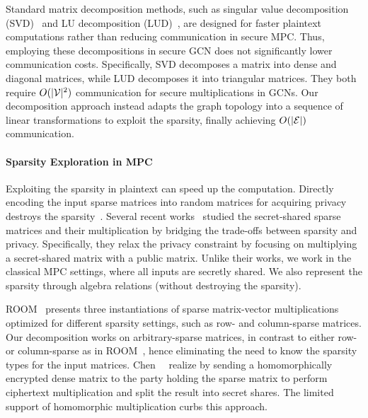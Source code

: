 Standard matrix decomposition methods, such as singular value decomposition (SVD)~\cite{banerjee2014linear} and LU decomposition (LUD)~\cite{bunch1974triangular}, are designed for faster plaintext computations rather than reducing communication in secure MPC.
Thus, employing these decompositions in secure GCN does not significantly lower communication costs.
Specifically, SVD decomposes a matrix into dense and diagonal matrices, while LUD decomposes it into triangular matrices. 
They both require $O(|\mathcal{V}|^2)$ communication for secure multiplications in GCNs.
Our decomposition approach instead adapts the graph topology into a sequence of linear transformations to exploit the sparsity, finally achieving $O(|\mathcal{E}|)$ communication.

\paragraph{Sparsity Exploration in MPC} 
Exploiting the sparsity in plaintext can speed up the computation.
Directly encoding the input sparse matrices into random matrices for acquiring privacy destroys the %
sparsity~\cite{isit/XhemrishiBW22}.
Several recent works~\cite{isit/XhemrishiBW22,tifs/BitarEWX24} studied the secret-shared sparse matrices and their multiplication by bridging the trade-offs between sparsity and privacy.
Specifically, they relax the privacy constraint by focusing on multiplying a secret-shared matrix with a public matrix.
Unlike their works, we work in the classical MPC settings, where all inputs are secretly shared. We also represent the sparsity through algebra relations (without destroying the sparsity).

ROOM~\cite{ccs/SchoppmannG0P19} presents three instantiations of sparse matrix-vector multiplications optimized for different sparsity settings, such as row- and column-sparse
matrices.
Our decomposition works on arbitrary-sparse matrices, in contrast to either row- or column-sparse as in ROOM~\cite{ccs/SchoppmannG0P19}, hence eliminating the need to know the sparsity types for the input matrices.
Chen~\etal~\cite{kdd/0001ZWWFTWLWH21} realize \osmm 
by sending a homomorphically encrypted dense matrix to the party holding the sparse matrix to perform ciphertext multiplication and split the result into secret shares.
The limited support of homomorphic multiplication curbs 
this approach.

